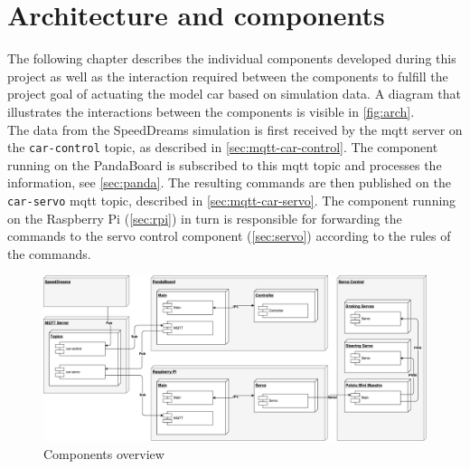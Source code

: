 \section{Architecture and components}
\label{sec:arch}
The following chapter describes the individual components developed during this project as well as the interaction required between the components to fulfill the project goal of actuating the model car based on simulation data. A diagram that illustrates the interactions between the components is visible in \autoref{fig:arch}. \\

The data from the SpeedDreams simulation is first received by the mqtt server on the \texttt{car-control} topic, as described in \autoref{sec:mqtt-car-control}.
The component running on the PandaBoard is subscribed to this mqtt topic and processes the information, see \autoref{sec:panda}.
The resulting commands are then published on the \texttt{car-servo} mqtt topic, described in \autoref{sec:mqtt-car-servo}.
The component running on the Raspberry Pi (\autoref{sec:rpi}) in turn is responsible for forwarding the commands to the servo control component (\autoref{sec:servo}) according to the rules of the commands. \\

\begin{figure}[h]
    \centering
    \includegraphics[width=1\linewidth]{images/components}
    \caption{Components overview}
    \label{fig:arch}
\end{figure}

\newpage




